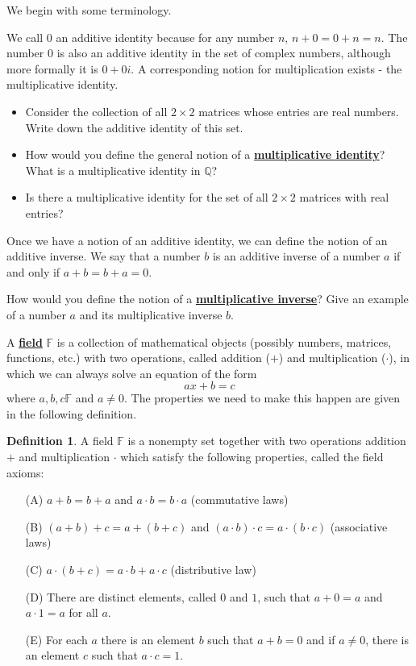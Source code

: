 \documentclass[11pt]{article}
\newenvironment{task}
	{\begin{mdframed}[linecolor=lightgray, linewidth=3pt]\raggedright}
	{\end{mdframed}}
\renewcommand\emph[1]{\underline{\bf{#1}}} %
\theoremstyle{definition}
\newtheorem{definition}[theorem]{Definition}
\begin{document}
We begin with some terminology.

We call $0$ an additive identity because for any number $n$, $n+0 = 0 + n = n$. The number $0$ is also an additive identity in the set of complex numbers,
although more formally it is $0+0i$. A corresponding notion for multiplication exists - the multiplicative identity.

\begin{task}
  \begin{itemize}
    \item Consider the collection of all $2\times 2$ matrices whose entries are real numbers. Write down the additive identity of this set.
    \item How would you define the general notion of a \emph{multiplicative identity}? What is a multiplicative identity in $\mathbb{Q}$?
    \item Is there a multiplicative identity for the set of all $2\times 2$ matrices with real entries?
  \end{itemize}
\end{task}

Once we have a notion of an additive identity, we can define the notion of an additive inverse. We say that 
a number $b$ is an additive inverse of a number $a$ if and only if $a+b=b+a = 0$. 

\begin{task}
  How would you define the notion of a \emph{multiplicative inverse}? Give an example of a number $a$ and its 
  multiplicative inverse $b$.
\end{task}

A \emph{field} $\mathbb{F}$ is a collection of mathematical objects (possibly numbers, matrices, functions, etc.) with two operations, called
addition ($+$) and multiplication ($\cdot$), in which we can always solve an equation of the form
\[ ax + b = c\]
where $a,b,c\mathbb{F}$ and $a \neq 0$. The properties we need to make this happen are given in the following definition.

\begin{definition} A field $\mathbb{F}$ is a nonempty set together with two operations addition $+$ and multiplication $\cdot$ which satisfy the following
  properties, called the field axioms:
  \begin{enumerate}
    \item[(A)] $a+b=b+a$ and $a\cdot b=b\cdot a$ (commutative laws)
    \item[(B)] $(a+b)+c = a + (b+c)$ and $(a\cdot b)\cdot c = a\cdot (b \cdot c)$ (associative laws)
    \item[(C)] $a\cdot (b+c) = a\cdot b + a \cdot c$ (distributive law)
    \item[(D)] There are distinct elements, called $0$ and $1$, such that $a+0 = a $ and $a \cdot 1 = a$ for all $a$.
    \item[(E)] For each $a$ there is an element $b$ such that $a + b = 0$ and if $a\neq 0$, there is an element $c$ such that $a\cdot c = 1$.
  \end{enumerate}
\end{definition}
\end{document}
